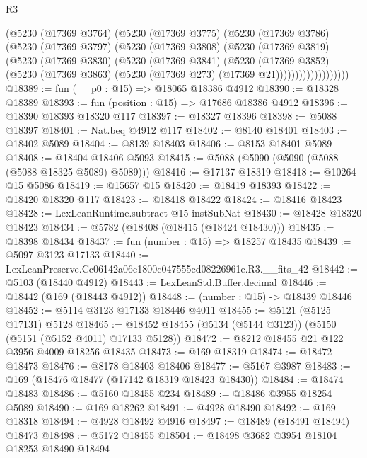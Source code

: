 \begin{lexlean}{R3}
\begin{coremodule}
                  (@5230
                    (@17369 @3764)
                    (@5230
                      (@17369 @3775)
                      (@5230
                        (@17369 @3786)
                        (@5230
                          (@17369 @3797)
                          (@5230
                            (@17369 @3808)
                            (@5230
                              (@17369 @3819)
                              (@5230
                                (@17369 @3830)
                                (@5230
                                  (@17369 @3841)
                                  (@5230
                                    (@17369 @3852)
                                    (@5230
                                      (@17369 @3863)
                                      (@5230 (@17369 @273) (@17369 @21)))))))))))))))))))
@18389 := fun (__p0 : @15) => @18065 @18386 @4912
@18390 := @18328 @18389
@18393 := fun (position : @15) => @17686 @18386 @4912
@18396 := @18390 @18393 @18320 @117
@18397 := @18327 @18396
@18398 := @5088 @18397
@18401 := Nat.beq @4912 @117
@18402 := @8140 @18401
@18403 := @18402 @5089
@18404 := @8139 @18403
@18406 := @8153 @18401 @5089
@18408 := @18404 @18406 @5093
@18415 := @5088 (@5090 (@5090 (@5088 (@5088 @18325 @5089) @5089)))
@18416 := @17137 @18319
@18418 := @10264 @15 @5086
@18419 := @15657 @15
@18420 := @18419 @18393
@18422 := @18420 @18320 @117
@18423 := @18418 @18422
@18424 := @18416 @18423
@18428 := LexLeanRuntime.subtract @15 instSubNat
@18430 := @18428 @18320 @18423
@18434 := @5782 (@18408 (@18415 (@18424 @18430)))
@18435 := @18398 @18434
@18437 := fun (number : @15) => @18257 @18435
@18439 := @5097 @3123 @17133
@18440 := LexLeanPreserve.Cc06142a06e1800c047555ed08226961e.R3.__fits_42
@18442 := @5103 (@18440 @4912)
@18443 := LexLeanStd.Buffer.decimal
@18446 := @18442 (@169 (@18443 @4912))
@18448 := (number : @15) -> @18439 @18446
@18452 := @5114 @3123 @17133 @18446 @4011
@18455 := @5121 (@5125 @17131) @5128
@18465 := @18452 @18455 (@5134 (@5144 @3123)) (@5150 (@5151 (@5152 @4011) @17133 @5128))
@18472 := @8212 @18455 @21 @122 @3956 @4009 @18256 @18435
@18473 := @169 @18319
@18474 := @18472 @18473
@18476 := @8178 @18403 @18406
@18477 := @5167 @3987
@18483 := @169 (@18476 @18477 (@17142 @18319 @18423 @18430))
@18484 := @18474 @18483
@18486 := @5160 @18455 @234
@18489 := @18486 @3955 @18254 @5089
@18490 := @169 @18262
@18491 := @4928 @18490
@18492 := @169 @18318
@18494 := @4928 @18492 @4916
@18497 := @18489 (@18491 @18494) @18473
@18498 := @5172 @18455
@18504 := @18498 @3682 @3954 @18104 @18253 @18490 @18494

\end{coremodule}
\end{lexlean}
